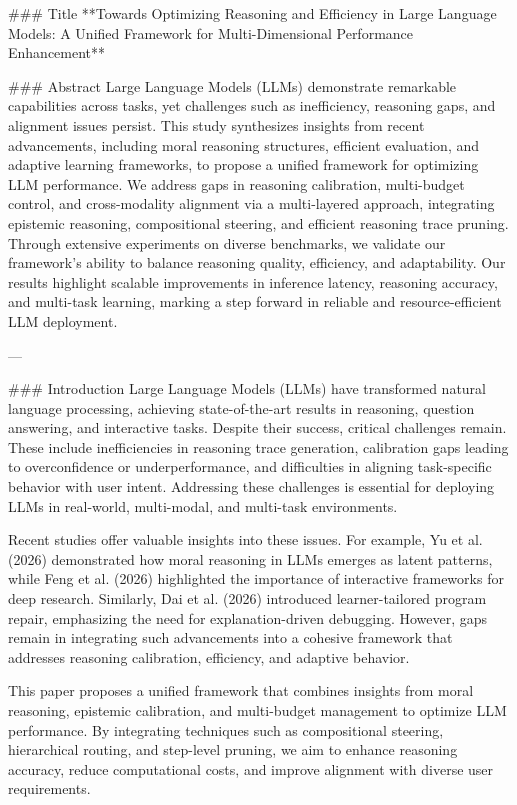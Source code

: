 ### Title
**Towards Optimizing Reasoning and Efficiency in Large Language Models: A Unified Framework for Multi-Dimensional Performance Enhancement**

### Abstract
Large Language Models (LLMs) demonstrate remarkable capabilities across tasks, yet challenges such as inefficiency, reasoning gaps, and alignment issues persist. This study synthesizes insights from recent advancements, including moral reasoning structures, efficient evaluation, and adaptive learning frameworks, to propose a unified framework for optimizing LLM performance. We address gaps in reasoning calibration, multi-budget control, and cross-modality alignment via a multi-layered approach, integrating epistemic reasoning, compositional steering, and efficient reasoning trace pruning. Through extensive experiments on diverse benchmarks, we validate our framework's ability to balance reasoning quality, efficiency, and adaptability. Our results highlight scalable improvements in inference latency, reasoning accuracy, and multi-task learning, marking a step forward in reliable and resource-efficient LLM deployment.

---

### Introduction
Large Language Models (LLMs) have transformed natural language processing, achieving state-of-the-art results in reasoning, question answering, and interactive tasks. Despite their success, critical challenges remain. These include inefficiencies in reasoning trace generation, calibration gaps leading to overconfidence or underperformance, and difficulties in aligning task-specific behavior with user intent. Addressing these challenges is essential for deploying LLMs in real-world, multi-modal, and multi-task environments.

Recent studies offer valuable insights into these issues. For example, Yu et al. (2026) demonstrated how moral reasoning in LLMs emerges as latent patterns, while Feng et al. (2026) highlighted the importance of interactive frameworks for deep research. Similarly, Dai et al. (2026) introduced learner-tailored program repair, emphasizing the need for explanation-driven debugging. However, gaps remain in integrating such advancements into a cohesive framework that addresses reasoning calibration, efficiency, and adaptive behavior.

This paper proposes a unified framework that combines insights from moral reasoning, epistemic calibration, and multi-budget management to optimize LLM performance. By integrating techniques such as compositional steering, hierarchical routing, and step-level pruning, we aim to enhance reasoning accuracy, reduce computational costs, and improve alignment with diverse user requirements.

